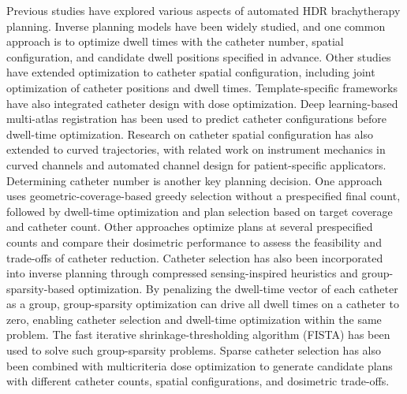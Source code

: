 \documentclass[12pt,twoside,letterpaper]{article}
\newcounter{algorithm}
\begin{document}
Previous studies have explored various aspects of automated HDR brachytherapy planning. Inverse planning models have been widely studied,\cite{ref27,ref28,ref29,ref30,ref31,ref32,ref33,ref34,ref35,ref36,ref37} and one common approach is to optimize dwell times with the catheter number, spatial configuration, and candidate dwell positions specified in advance.\cite{ref38,ref39,ref40,ref41,ref42,ref43,ref44,ref45,ref46} Other studies have extended optimization to catheter spatial configuration,\cite{ref26,ref47,ref48,ref49,ref50,ref51,ref52,ref53,ref54} including joint optimization of catheter positions and dwell times.\cite{ref55,ref56} Template-specific frameworks have also integrated catheter design with dose optimization.\cite{ref25,ref57} Deep learning-based multi-atlas registration has been used to predict catheter configurations before dwell-time optimization.\cite{ref58} Research on catheter spatial configuration has also extended to curved trajectories,\cite{ref59,ref60,ref61,ref62,ref63,ref64} with related work on instrument mechanics in curved channels\cite{ref65} and automated channel design for patient-specific applicators.\cite{ref66} Determining catheter number is another key planning decision.\cite{ref67} One approach uses geometric-coverage-based greedy selection without a prespecified final count, followed by dwell-time optimization and plan selection based on target coverage and catheter count.\cite{ref26} Other approaches optimize plans at several prespecified counts and compare their dosimetric performance to assess the feasibility and trade-offs of catheter reduction.\cite{ref25,ref48,ref55,ref68} Catheter selection has also been incorporated into inverse planning through compressed sensing-inspired heuristics\cite{ref69} and group-sparsity-based optimization.\cite{ref70,ref71} By penalizing the dwell-time vector of each catheter as a group, group-sparsity optimization can drive all dwell times on a catheter to zero, enabling catheter selection and dwell-time optimization within the same problem. The fast iterative shrinkage-thresholding algorithm (FISTA)\cite{ref72} has been used to solve such group-sparsity problems.\cite{ref70,ref71} Sparse catheter selection has also been combined with multicriteria dose optimization to generate candidate plans with different catheter counts, spatial configurations, and dosimetric trade-offs.\cite{ref73}
\end{document}
